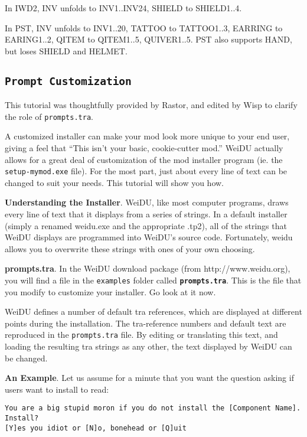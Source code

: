 \documentclass{article}
\def\DEFINE#1{{\tt \bf #1}\label{#1}\index{#1}}
\def\t#1{{\tt #1}}
\begin{document}
In IWD2, INV unfolds to INV1..INV24, SHIELD to SHIELD1..4.

In PST, INV unfolds to INV1..20, TATTOO to TATTOO1..3, EARRING to EARING1..2,
QITEM to QITEM1..5, QUIVER1..5. PST also supports HAND, but loses SHIELD and
HELMET.

\subsection{\DEFINE{Prompt Customization}}
This tutorial was thoughtfully provided by Rastor, and edited by Wisp to
clarify the role of \t{prompts.tra}.

A customized installer can make your mod look more unique to your end user,
giving a feel that ``This isn't your basic, cookie-cutter mod.''  WeiDU
actually allows for a great deal of customization of the mod installer
program (ie. the \t{setup-mymod.exe} file).  For the most part, just about
every line of text can be changed to suit your needs.  This tutorial will
show you how.

{\bf Understanding the Installer}.
WeiDU, like most computer programs, draws every line of text that it
displays from a series of strings.  In a default installer (simply a
renamed weidu.exe and the appropriate .tp2), all of the strings that WeiDU
displays are programmed into WeiDU's source code.  Fortunately, weidu
allows you to overwrite these strings with ones of your own choosing.

{\bf prompts.tra}.
In the WeiDU download package (from http://www.weidu.org), you will find a
file in the \t{examples} folder called \DEFINE{prompts.tra}.  This is the
file that you modify to customize your installer. Go look at it now.

WeiDU defines a number of default tra references, which are displayed
at different points during the installation. The tra-reference numbers
and default text are reproduced in the \t{prompts.tra} file. By
editing or translating this text, and loading the resulting tra
strings as any other, the text displayed by WeiDU can be changed.

{\bf An Example}.
Let us assume for a minute that you want the question asking if users want
to install to read:
\begin{verbatim}
You are a big stupid moron if you do not install the [Component Name].
Install?
[Y]es you idiot or [N]o, bonehead or [Q]uit
\end{verbatim}
\end{document}
